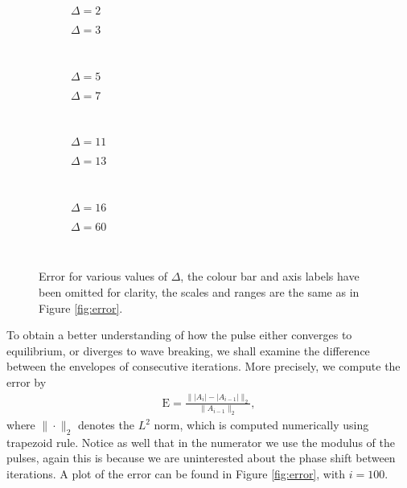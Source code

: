 \begin{figure}[p]
\begin{subfigure}{0.5\textwidth}

\caption{$\Delta = 2$}
\end{subfigure}
\begin{subfigure}{0.5\textwidth}

\caption{$\Delta = 3$}
\end{subfigure} \\
\begin{subfigure}{0.5\textwidth}

\caption{$\Delta = 5$}
\end{subfigure}
\begin{subfigure}{0.5\textwidth}

\caption{$\Delta = 7$}
\end{subfigure} \\
\begin{subfigure}{0.5\textwidth}

\caption{$\Delta = 11$}
\end{subfigure}
\begin{subfigure}{0.5\textwidth}

\caption{$\Delta = 13$}
\end{subfigure} \\
\begin{subfigure}{0.5\textwidth}

\caption{$\Delta = 16$}
\end{subfigure}
\begin{subfigure}{0.5\textwidth}

\caption{$\Delta = 60$}
\end{subfigure} \\
\caption[Error for various values of $\Delta$.]{Error for various values of $\Delta$, the colour bar and axis labels have been omitted for clarity, the scales and ranges are the same as in Figure \ref{fig:error}.}
\label{fig:deltaerror}
\end{figure}

To obtain a better understanding of how the pulse either converges to equilibrium, or diverges to wave breaking, we shall examine the difference between the envelopes of consecutive iterations. More precisely, we compute the error by
\begin{align}
\textrm{E} = \frac{\| |A_i| - |A_{i-1}| \|_2}{\| A_{i-1} \|_2},
\label{eq:error}
\end{align}
where $\| \cdot \|_2$ denotes the $L^2$ norm, which is computed numerically using trapezoid rule. Notice as well that in the numerator we use the modulus of the pulses, again this is because we are uninterested about the phase shift between iterations. A plot of the error can be found in Figure \ref{fig:error}, with $i = 100$. \\

